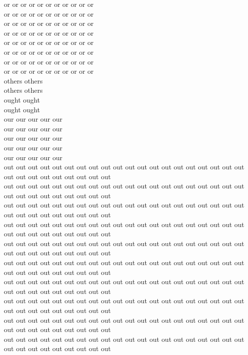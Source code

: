 or or or or or or or or or or or\\
or or or or or or or or or or or\\
or or or or or or or or or or or\\
or or or or or or or or or or or\\
or or or or or or or or or or or\\
or or or or or or or or or or or\\
or or or or or or or or or or or\\
or or or or or or or or or or or\\
others others\\
others others\\
ought ought\\
ought ought\\
our our our our our\\
our our our our our\\
our our our our our\\
our our our our our\\
our our our our our\\
out out out out out out out out out out out out out out out out out out out out out out out out out out out out out\\
out out out out out out out out out out out out out out out out out out out out out out out out out out out out out\\
out out out out out out out out out out out out out out out out out out out out out out out out out out out out out\\
out out out out out out out out out out out out out out out out out out out out out out out out out out out out out\\
out out out out out out out out out out out out out out out out out out out out out out out out out out out out out\\
out out out out out out out out out out out out out out out out out out out out out out out out out out out out out\\
out out out out out out out out out out out out out out out out out out out out out out out out out out out out out\\
out out out out out out out out out out out out out out out out out out out out out out out out out out out out out\\
out out out out out out out out out out out out out out out out out out out out out out out out out out out out out\\
out out out out out out out out out out out out out out out out out out out out out out out out out out out out out\\

